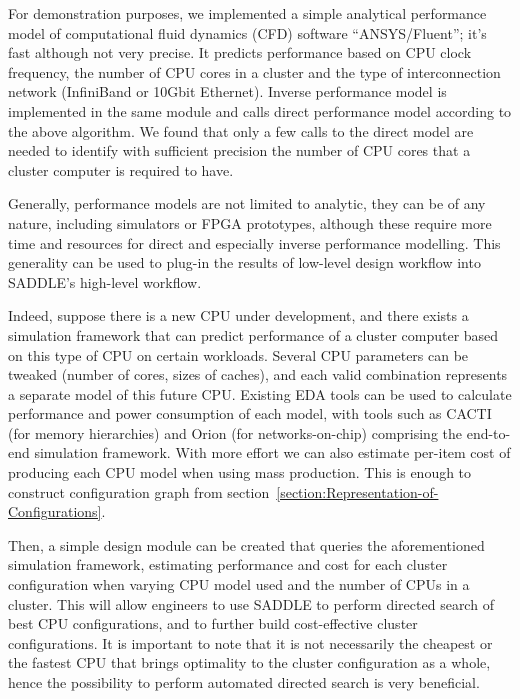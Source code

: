\documentclass[runningheads,a4paper]{llncs}
\begin{document}
For demonstration purposes, we implemented a simple analytical performance model of computational fluid dynamics (CFD) software ``ANSYS/Fluent''; it's fast although not very precise. It predicts performance based on CPU clock frequency, the number of CPU cores in a cluster and the type of interconnection network (InfiniBand or 10Gbit Ethernet). Inverse performance model is implemented in the same module and calls direct performance model according to the above algorithm. We found that only a few calls to the direct model are needed to identify with sufficient precision the number of CPU cores that a cluster computer is required to have.

Generally, performance models are not limited to analytic, they can be of any nature, including simulators or FPGA prototypes, although these require more time and resources for direct and especially inverse performance modelling. This generality can be used to plug-in the results of low-level design workflow into SADDLE's high-level workflow.

Indeed, suppose there is a new CPU under development, and there exists a simulation framework that can predict performance of a cluster computer based on this type of CPU on certain workloads. Several CPU parameters can be tweaked (number of cores, sizes of caches), and each valid combination represents a separate model of this future CPU. Existing EDA tools can be used to calculate performance and power consumption of each model, with tools such as CACTI \cite{muralimanohar2007optimizing} (for memory hierarchies) and Orion \cite{kahng2009orion} (for networks-on-chip) comprising the end-to-end simulation framework. With more effort we can also estimate per-item cost of producing each CPU model when using mass production. This is enough to construct configuration graph from section~\ref{section:Representation-of-Configurations}.

Then, a simple design module can be created that queries the aforementioned simulation framework, estimating performance and cost for each cluster configuration when varying CPU model used and the number of CPUs in a cluster. This will allow engineers to use SADDLE to perform directed search of best CPU configurations, and to further build cost-effective cluster configurations. It is important to note that it is not necessarily the cheapest or the fastest CPU that brings optimality to the cluster configuration as a whole, hence the possibility to perform automated directed search is very beneficial.
\end{document}
